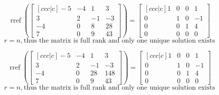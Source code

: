 \documentclass[basic]{inVerba-notes}
\begin{document}
\begin{enumerate}[align=left, leftmargin=0pt, labelindent=\parindent, listparindent=\parindent, labelwidth=0pt, itemindent=!]
  \newpage

  \color{text}

  \[%
  \operatorname{rref}\left(\begin{bmatrix}[ccc|c]
    -5 & -4 & 1 & 3 \\
    3 & 2 & -1  & -3\\
    -4 & 0 & 8  & 28 \\
    7 & 0 & 9 & 43
    \end{bmatrix}\right) =
    \begin{bmatrix}[ccc|c]
      1 & 0 & 0 & 1  \\   
      0 & 1 & 0 & -1 \\
      0 & 0 & 1 & 4  \\
      0 & 0 & 0 & 0
    \end{bmatrix}
  \]%
  \[%
  r = n, \text{thus the matrix is full rank and only one unique solution exists}
  \]%
  
  \[%
  \operatorname{rref}\left(\begin{bmatrix}[ccc|c]
    -5 & -4 & 1 & 3 \\
    3 & 2 & -1  & -3\\
    -4 & 0 & 28  & 148 \\
    7 & 0 & 9 & 43
    \end{bmatrix}\right) =
    \begin{bmatrix}[ccc|c]
      1 & 0 & 0 & 1  \\   
      0 & 1 & 0 & -1 \\
      0 & 0 & 1 & 4  \\
      0 & 0 & 0 & 0
    \end{bmatrix}
  \]%
  \[%
  r = n, \text{thus the matrix is full rank and only one unique solution exists}
  \]%


\end{enumerate}
\end{document}
